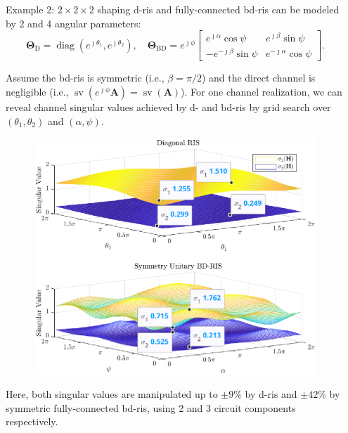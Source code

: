 \documentclass[final,xcolor={table}]{beamer}
\DeclareMathOperator{\diag}{diag}
\DeclareMathOperator{\sv}{sv}
\newlength{\sepwidth}
\newlength{\colwidth}
\newcommand{\separatorcolumn}{\begin{column}{\sepwidth}\end{column}}
\begin{document}
\begin{frame}[t]
\begin{columns}[t]
\begin{column}{\colwidth}
			\begin{exampleblock}{Example 2: $2 \times 2 \times 2$ shaping}
				\setlength{\leftskip}{\leftmargini}
				\setlength{\rightskip}{\leftmargini}
				\gls{d}-\gls{ris} and fully-connected \gls{bd}-\gls{ris} can be modeled by 2 and 4 angular parameters:
				\begin{equation*}
					\mathbf{\Theta}_\mathrm{D} = \diag(e^{\jmath \theta_1}, e^{\jmath \theta_2}), \quad
					\mathbf{\Theta}_\mathrm{BD} = e^{\jmath \phi} \begin{bmatrix}
						e^{\jmath \alpha} \cos \psi  & e^{\jmath \beta} \sin \psi   \\
						-e^{-\jmath \beta} \sin \psi & e^{-\jmath \alpha} \cos \psi
					\end{bmatrix}.
				\end{equation*}

				Assume the \gls{bd}-\gls{ris} is symmetric (i.e., $\beta = \pi / 2$) and the direct channel is negligible (i.e., $\sv(e^{\jmath \phi} \mathbf{A}) = \sv(\mathbf{A})$).
				For one channel realization, we can reveal channel singular values achieved by \gls{d}- and \gls{bd}-\gls{ris} by grid search over $(\theta_1, \theta_2)$ and $(\alpha, \psi)$.
				\begin{figure}
					\centering
					\includegraphics[width=0.41\columnwidth]{../assets/simulation/singular_trend.eps}
				\end{figure}
				Here, both singular values are manipulated up to $\pm 9\%$ by \gls{d}-\gls{ris} and $\pm 42\%$ by symmetric fully-connected \gls{bd}-\gls{ris}, using 2 and 3 circuit components respectively.
			\end{exampleblock}
		\end{column}

		\separatorcolumn


\end{columns}
\end{frame}
\end{document}

